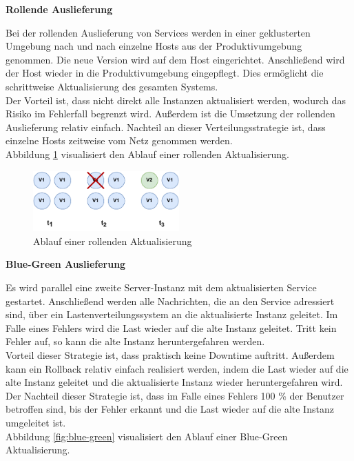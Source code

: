 \textbf{Rollende Auslieferung}

Bei der rollenden Auslieferung von Services werden in einer geklusterten Umgebung nach und nach einzelne Hosts aus der Produktivumgebung genommen. Die neue Version wird auf dem Host eingerichtet. Anschließend wird der Host wieder in die Produktivumgebung eingepflegt. Dies ermöglicht die schrittweise Aktualisierung des gesamten Systems.\\
Der Vorteil ist, dass nicht direkt alle Instanzen aktualisiert werden, wodurch das Risiko im Fehlerfall begrenzt wird. Außerdem ist die Umsetzung der rollenden Auslieferung relativ einfach. Nachteil an dieser Verteilungsstrategie ist, dass einzelne Hosts zeitweise vom Netz genommen werden.\\
Abbildung \ref{fig:rolling} visualisiert den Ablauf einer rollenden Aktualisierung.\\

\begin{figure}[H]
  \centering
  \includegraphics[width=0.5\textwidth]{images/rolling.pdf}
  \caption{Ablauf einer rollenden Aktualisierung}
  \label{fig:rolling}
\end{figure}

\textbf{Blue-Green Auslieferung}

Es wird parallel eine zweite Server-Instanz mit dem aktualisierten Service gestartet. Anschließend werden alle Nachrichten, die an den Service adressiert sind, über ein Lastenverteilungssystem an die aktualisierte Instanz geleitet. Im Falle eines Fehlers wird die Last wieder auf die alte Instanz geleitet. Tritt kein Fehler auf, so kann die alte Instanz heruntergefahren werden.\\
Vorteil dieser Strategie ist, dass praktisch keine Downtime auftritt. Außerdem kann ein Rollback relativ einfach realisiert werden, indem die Last wieder auf die alte Instanz geleitet und die aktualisierte Instanz wieder heruntergefahren wird.\\
Der Nachteil dieser Strategie ist, dass im Falle eines Fehlers 100 \% der Benutzer betroffen sind, bis der Fehler erkannt und die Last wieder auf die alte Instanz umgeleitet ist.\\
Abbildung \ref{fig:blue-green} visualisiert den Ablauf einer Blue-Green Aktualisierung.\\

